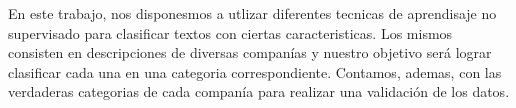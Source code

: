 En este trabajo, nos disponesmos a utlizar diferentes tecnicas de aprendisaje no supervisado para clasificar textos con ciertas caracteristicas. Los mismos consisten en descripciones de diversas companías y nuestro objetivo será lograr clasificar cada una en una categoria correspondiente. Contamos, ademas, con las verdaderas categorias de cada companía para realizar una validación de los datos.
